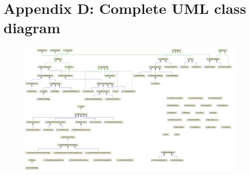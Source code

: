 \section*{Appendix D: Complete UML class diagram}
\label{sec:appendix_D}

\begin{figure}[h!]
\centering
\includegraphics[scale=0.25, angle=90]{pictures/uml_diagram.png}
\end{figure}